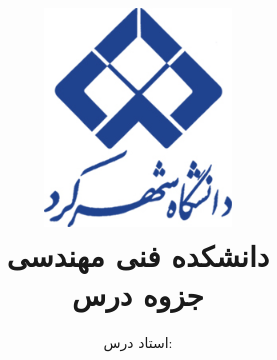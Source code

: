 \title{
    \center
    \includegraphics[width=5cm, height=5.8cm]{images/SKU_logo_color.jpg} \\
    دانشکده فنی مهندسی \\[25pt]     
جزوه درس \\
\CourseName
}

\author{
    استاد درس:
    \Instructor \\[25pt]
}
\date{\Semester}